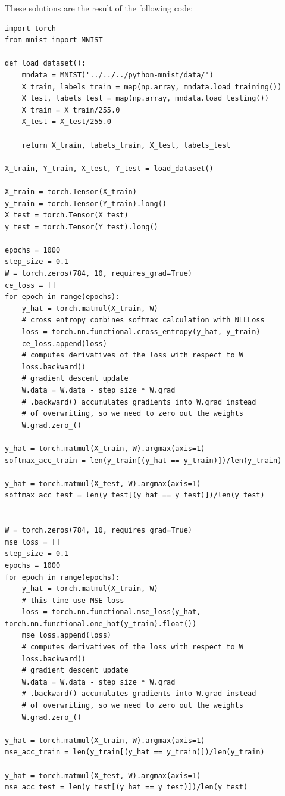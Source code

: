 \documentclass{article}
\begin{document}
\begin{enumerate}
\begin{figure}[h]
\begin{subfigure}{0.45\textwidth}
                \end{subfigure}
        \end{figure}

        These solutions are the result of the following code:
        \begin{verbatim}
import torch
from mnist import MNIST

def load_dataset():
    mndata = MNIST('../../../python-mnist/data/')
    X_train, labels_train = map(np.array, mndata.load_training())
    X_test, labels_test = map(np.array, mndata.load_testing())
    X_train = X_train/255.0
    X_test = X_test/255.0
    
    return X_train, labels_train, X_test, labels_test

X_train, Y_train, X_test, Y_test = load_dataset()

X_train = torch.Tensor(X_train)
y_train = torch.Tensor(Y_train).long()
X_test = torch.Tensor(X_test)
y_test = torch.Tensor(Y_test).long()

epochs = 1000
step_size = 0.1
W = torch.zeros(784, 10, requires_grad=True)
ce_loss = []
for epoch in range(epochs):
    y_hat = torch.matmul(X_train, W)
    # cross entropy combines softmax calculation with NLLLoss
    loss = torch.nn.functional.cross_entropy(y_hat, y_train)
    ce_loss.append(loss)
    # computes derivatives of the loss with respect to W
    loss.backward()
    # gradient descent update
    W.data = W.data - step_size * W.grad
    # .backward() accumulates gradients into W.grad instead
    # of overwriting, so we need to zero out the weights
    W.grad.zero_()

y_hat = torch.matmul(X_train, W).argmax(axis=1)
softmax_acc_train = len(y_train[(y_hat == y_train)])/len(y_train)

y_hat = torch.matmul(X_test, W).argmax(axis=1)
softmax_acc_test = len(y_test[(y_hat == y_test)])/len(y_test)


W = torch.zeros(784, 10, requires_grad=True)
mse_loss = []
step_size = 0.1
epochs = 1000
for epoch in range(epochs):
    y_hat = torch.matmul(X_train, W)
    # this time use MSE loss
    loss = torch.nn.functional.mse_loss(y_hat, torch.nn.functional.one_hot(y_train).float())
    mse_loss.append(loss)
    # computes derivatives of the loss with respect to W
    loss.backward()
    # gradient descent update
    W.data = W.data - step_size * W.grad
    # .backward() accumulates gradients into W.grad instead
    # of overwriting, so we need to zero out the weights
    W.grad.zero_()

y_hat = torch.matmul(X_train, W).argmax(axis=1)
mse_acc_train = len(y_train[(y_hat == y_train)])/len(y_train)

y_hat = torch.matmul(X_test, W).argmax(axis=1)
mse_acc_test = len(y_test[(y_hat == y_test)])/len(y_test)
        \end{verbatim}
\end{enumerate}
\end{document}
